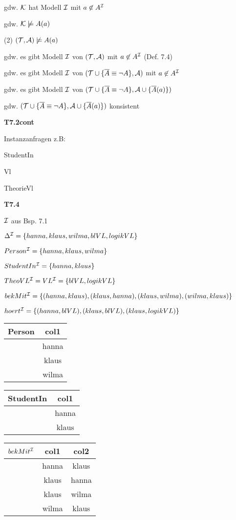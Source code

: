 gdw. $\mathcal{K}$ hat Modell $\mathcal{I}$ mit $a \not\in A^{\mathcal{I}}$

gdw. $\mathcal{K} \not\models A(a)$

(2) $(\mathcal{T}, \mathcal{A}) \not\models A(a)$

gdw. es gibt Modell $\mathcal{I}$ von $(\mathcal{T}, \mathcal{A})$ mit $a \not\in A^{\mathcal{I}}$ (Def. 7.4)

gdw. es gibt Modell $\mathcal{I}$ von $(\mathcal{T} \cup \{\overline{A} \equiv \neg A\}, \mathcal{A})$ mit $a \not\in A^{\mathcal{I}}$

gdw. es gibt Modell $\mathcal{I}$ von $(\mathcal{T} \cup \{\overline{A} \equiv \neg A\}, \mathcal{A} \cup \{\overline{A}(a)\})$

gdw. $(\mathcal{T} \cup \{\overline{A} \equiv \neg A\}, \mathcal{A} \cup \{\overline{A}(a)\})$ konsistent

\textbf{T7.2cont}

Instanzanfragen z.B:

StudentIn

Vl

TheorieVl

\textbf{T7.4}

$\mathcal{I}$ aus Bsp. 7.1

$\Delta^{\mathcal{I}} = \{hanna, klaus, wilma, blVL, logikVL\}$

$Person^{\mathcal{I}} = \{hanna,klaus,wilma\}$

$StudentIn^{\mathcal{I}} = \{hanna,klaus\}$

$TheoVL^{\mathcal{I}} = VL^{\mathcal{I}} = \{blVL, logikVL\}$

$bekMit^{\mathcal{I}} = \{(hanna,klaus), (klaus, hanna), (klaus, wilma), (wilma, klaus)\}$

$hoert^{\mathcal{I}} = \{(hanna, blVL), (klaus,blVL), (klaus,logikVL)\}$

\begin{tabular}{c | c}
Person & col1 \\ \hline
 & hanna \\
 & klaus \\
 & wilma
\end{tabular}

\begin{tabular}{c | c}
StudentIn & col1 \\ \hline
 & hanna \\
 & klaus
\end{tabular}

\begin{tabular}{c | c | c}
$bekMit^{\mathcal{I}}$ & col1 & col2 \\ \hline
 & hanna & klaus\\
 & klaus & hanna\\
 & klaus & wilma \\
 & wilma & klaus
\end{tabular}

